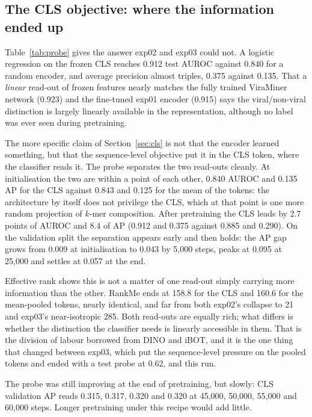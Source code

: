 \documentclass[10pt,twocolumn,a4paper]{article}
\begin{document}
\subsection{The CLS objective: where the information ended up}\label{sec:res:cls}

Table~\ref{tab:probe} gives the answer exp02 and exp03 could not. A logistic
regression on the frozen CLS reaches 0.912 test AUROC against 0.840 for a random
encoder, and average precision almost triples, 0.375 against 0.135. That a
\emph{linear} read-out of frozen features nearly matches the fully trained
ViraMiner network (0.923) and the fine-tuned exp01 encoder (0.915) says the
viral/non-viral distinction is largely linearly available in the representation,
although no label was ever seen during pretraining.

The more specific claim of Section~\ref{sec:cls} is not that the encoder learned
something, but that the sequence-level objective put it in the CLS token, where
the classifier reads it. The probe separates the two read-outs cleanly. At
initialisation the two are within a point of each other, 0.840 AUROC and 0.135 AP
for the CLS against 0.843 and 0.125 for the mean of the tokens: the architecture
by itself does not privilege the CLS, which at that point is one more random
projection of $k$-mer composition. After pretraining the CLS leads by 2.7 points
of AUROC and 8.4 of AP (0.912 and 0.375 against 0.885 and 0.290). On the
validation split the separation appears early and then holds: the AP gap grows
from 0.009 at initialisation to 0.043 by 5{,}000 steps, peaks at 0.095 at
25{,}000 and settles at 0.057 at the end.

Effective rank shows this is not a matter of one read-out simply carrying more
information than the other. RankMe ends at 158.8 for the CLS and 160.6 for the
mean-pooled tokens, nearly identical, and far from both exp02's collapse to 21
and exp03's near-isotropic 285. Both read-outs are equally rich; what differs is
whether the distinction the classifier needs is linearly accessible in them. That
is the division of labour borrowed from DINO and iBOT, and it is the one thing
that changed between exp03, which put the sequence-level pressure on the pooled
tokens and ended with a test probe at 0.62, and this run.

The probe was still improving at the end of pretraining, but slowly: CLS
validation AP reads 0.315, 0.317, 0.320 and 0.320 at 45{,}000, 50{,}000,
55{,}000 and 60{,}000 steps. Longer pretraining under this recipe would add
little.
\end{document}
